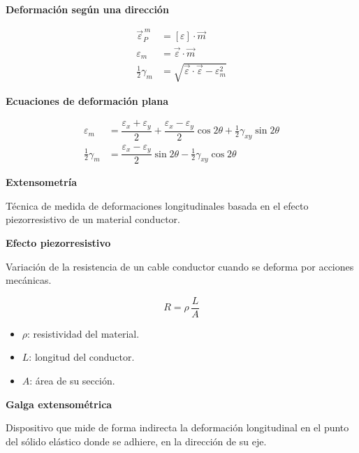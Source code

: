 \documentclass[10pt,a4paper]{article}
\begin{document}
\begin{tcolorbox}[itembox]
\textbf{Deformación según una dirección}\par
\[
\begin{aligned}\vec\varepsilon_P^{\,m}&=[\varepsilon]\cdot\vec m\\ \varepsilon_m&=\vec\varepsilon\cdot\vec m\\ \tfrac12\gamma_m&=\sqrt{\vec\varepsilon\cdot\vec\varepsilon-\varepsilon_m^{2}}\end{aligned}
\]
\end{tcolorbox}

\begin{tcolorbox}[itembox]
\textbf{Ecuaciones de deformación plana}\par
\[
\begin{aligned}\varepsilon_m&=\dfrac{\varepsilon_x+\varepsilon_y}{2}+\dfrac{\varepsilon_x-\varepsilon_y}{2}\cos2\theta+\tfrac12\gamma_{xy}\sin2\theta\\ \tfrac12\gamma_m&=\dfrac{\varepsilon_x-\varepsilon_y}{2}\sin2\theta-\tfrac12\gamma_{xy}\cos2\theta\end{aligned}
\]
\end{tcolorbox}

\begin{tcolorbox}[itembox]
\textbf{Extensometría}\par
\smallskip\noindent Técnica de medida de deformaciones longitudinales basada en el efecto piezorresistivo de un material conductor.\par
\end{tcolorbox}

\begin{tcolorbox}[itembox]
\textbf{Efecto piezorresistivo}\par
\smallskip\noindent Variación de la resistencia de un cable conductor cuando se deforma por acciones mecánicas.\par
\[
R=\rho\,\dfrac{L}{A}
\]
{\small\begin{itemize}[leftmargin=*,nosep,label={--}]
\item $\rho$: resistividad del material.
\item $L$: longitud del conductor.
\item $A$: área de su sección.
\end{itemize}}
\end{tcolorbox}

\begin{tcolorbox}[itembox]
\textbf{Galga extensométrica}\par
\smallskip\noindent Dispositivo que mide de forma indirecta la deformación longitudinal en el punto del sólido elástico donde se adhiere, en la dirección de su eje.\par
\end{tcolorbox}
\end{document}
